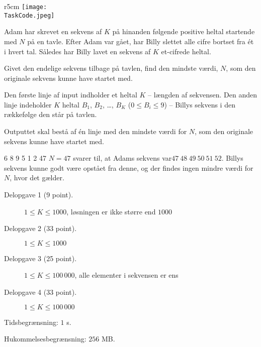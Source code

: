 \documentclass{boi2014-dk}
\renewcommand{\TaskCode}{sequence}
\begin{document}
    \begin{wrapfigure}[5]{r}{5cm}
        \vspace{-24pt}
		\texttt{[image: \\TaskCode.jpeg]}
	\end{wrapfigure}

    Adam har skrevet en sekvens af $K$ på hinanden følgende positive heltal
    startende med $N$ på en tavle. Efter Adam var gået, har Billy slettet alle
    cifre bortset fra ét i hvert tal. Således har Billy lavet en sekvens af $K$
    et-cifrede heltal.

    \Task

    Givet den endelige sekvens tilbage på tavlen, find den mindste værdi, $N$,
    som den originale sekvens kunne have startet med.

    \Input

    Den første linje af input indholder et heltal $K$ -- længden af sekvensen.
    Den anden linje indeholder $K$ heltal $B_1$, $B_2$, \ldots, $B_K$ ($0\le
    B_i\le 9$) -- Billys sekvens i den rækkefølge den står på tavlen.

    \Output

    Outputtet skal bestå af én linje med den mindste værdi for $N$, som den
    originale sekvens kunne have startet med.

    \Example

    \example
    {
        6 8 9 5 1 2
    }
    {
        47
    }
    {
        $N = 47$ svarer til, at Adams sekvens var\linebreak $47\ 48\ 49\ 50\ 51\ 52$.
        Billys sekvens kunne godt være opstået fra denne, og der findes ingen
        mindre værdi for $N$, hvor det gælder.
    }

\Scoring

\begin{description}
    \item[Delopgave 1 (9 point).] $1 \le K \le 1000$, løsningen er ikke større
        end $1000$
    \item[Delopgave 2 (33 point).] $1 \le K \le 1000$
    \item[Delopgave 3 (25 point).] $1 \le K \le 100\,000$, alle elementer i
        sekvensen er ens
    \item[Delopgave 4 (33 point).] $1 \le K \le 100\,000$
\end{description}

\Constraints

Tidsbegrænsning: $1$ s.

Hukommelsesbegrænsning: $256$ MB.
\end{document}
